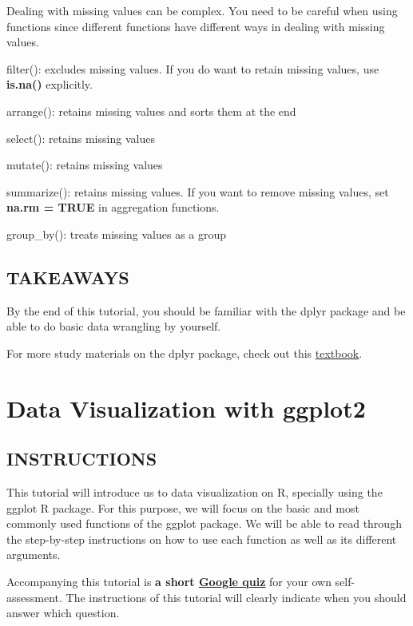 \documentclass[
]{book}
\begin{document}
Dealing with missing values can be complex. You need to be careful when using functions since different functions have different ways in dealing with missing values.

filter(): excludes missing values. If you do want to retain missing values, use \textbf{is.na()} explicitly.

arrange(): retains missing values and sorts them at the end

select(): retains missing values

mutate(): retains missing values

summarize(): retains missing values. If you want to remove missing values, set \textbf{na.rm = TRUE} in aggregation functions.

group\_by(): treats missing values as a group

\hypertarget{takeaways-2}{%
\section{TAKEAWAYS}\label{takeaways-2}}

By the end of this tutorial, you should be familiar with the dplyr package and be able to do basic data wrangling by yourself.

For more study materials on the dplyr package, check out this \href{https://learning.oreilly.com/library/view/r-for-data/9781491910382/ch03.html\#transform}{textbook}.

\hypertarget{data-visualization-with-ggplot2}{%
\chapter{Data Visualization with ggplot2}\label{data-visualization-with-ggplot2}}

\hypertarget{instructions-5}{%
\section{INSTRUCTIONS}\label{instructions-5}}

This tutorial will introduce us to data visualization on R, specially using the ggplot R package. For this purpose, we will focus on the basic and most commonly used functions of the ggplot package. We will be able to read through the step-by-step instructions on how to use each function as well as its different arguments.

Accompanying this tutorial is \textbf{a short \href{https://forms.gle/yUvW9Sg8mqEozyYu8}{Google quiz}} for your own self-assessment. The instructions of this tutorial will clearly indicate when you should answer which question.
\end{document}
